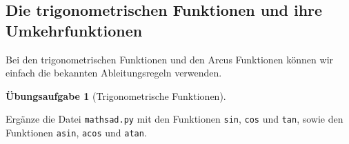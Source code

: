 \documentclass[
  letterpaper,
  DIV=11,
  oneside]{scrreprt}
\theoremstyle{definition}
\newtheorem{exercise}{Übungsaufgabe}[chapter]
\theoremstyle{definition}
\theoremstyle{remark}
\begin{document}
\hypertarget{die-trigonometrischen-funktionen-und-ihre-umkehrfunktionen}{%
\subsection{Die trigonometrischen Funktionen und ihre
Umkehrfunktionen}\label{die-trigonometrischen-funktionen-und-ihre-umkehrfunktionen}}

Bei den trigonometrischen Funktionen und den Arcus Funktionen können wir
einfach die bekannten Ableitungsregeln verwenden.

\leavevmode{}%
\begin{exercise}[Trigonometrische Funktionen]\label{exr-implementTrig}

Ergänze die Datei \texttt{mathsad.py} mit den Funktionen \texttt{sin},
\texttt{cos} und \texttt{tan}, sowie den Funktionen \texttt{asin},
\texttt{acos} und \texttt{atan}.

\end{exercise}
\end{document}

